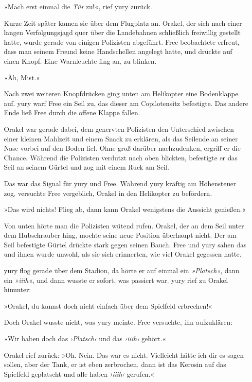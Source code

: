 »Mach erst einmal die \textit{Tür} zu!«, rief yury zurück.

Kurze Zeit später kamen sie über dem Flugplatz an. Orakel, der sich nach einer langen Verfolgungsjagd quer über die Landebahnen schließlich freiwillig gestellt hatte, wurde gerade von einigen Polizisten abgeführt. Free beobachtete erfreut, dass man seinem Freund keine Handschellen angelegt hatte, und drückte auf einen Knopf. Eine Warnleuchte fing an, zu blinken. %

»Äh, Mist.«

Nach zwei weiteren Knopfdrücken ging unten am Helikopter eine Bodenklappe auf. yury warf Free ein Seil zu, das dieser am Copilotensitz befestigte. Das andere Ende ließ Free durch die offene Klappe fallen.

Orakel war gerade dabei, dem genervten Polizisten den Unterschied zwischen einer kleinen Mahlzeit und einem Snack zu erklären, als das Seilende an seiner Nase vorbei auf den Boden fiel. Ohne groß darüber nachzudenken, ergriff er die Chance. Während die Polizisten verdutzt nach oben blickten, befestigte er das Seil an seinem Gürtel und zog mit einem Ruck am Seil.

Das war das Signal für yury und Free. Während yury kräftig am Höhensteuer zog, versuchte Free vergeblich, Orakel in den Helikopter zu befördern.

»Das wird nichts! Flieg ab, dann kann Orakel wenigstens die Aussicht genießen.«

Von unten hörte man die Polizisten wütend rufen. Orakel, der an dem Seil unter dem Hubschrauber hing, mochte seine neue Position überhaupt nicht. Der am Seil befestigte Gürtel drückte stark gegen seinen Bauch. Free und yury sahen das und ihnen wurde unwohl, als sie sich erinnerten, wie viel Orakel gegessen hatte.

yury flog gerade über dem Stadion, da hörte er auf einmal ein \textit{»Platsch«}, dann ein \textit{»iiih«}, und dann wusste er sofort, was passiert war. yury rief zu Orakel hinunter:

»Orakel, du kannst doch nicht einfach über dem Spielfeld erbrechen!«

Doch Orakel wusste nicht, was yury meinte. Free versuchte, ihn aufzuklären:

»Wir haben doch das \textit{›Platsch‹} und das \textit{›iiih‹} gehört.«

Orakel rief zurück: »Oh. Nein. Das war es nicht. Vielleicht hätte ich dir es sagen sollen, aber der Tank, er ist eben zerbrochen, dann ist das Kerosin auf das Spielfeld geplatscht und alle haben \textit{›iiih‹} gerufen.«

